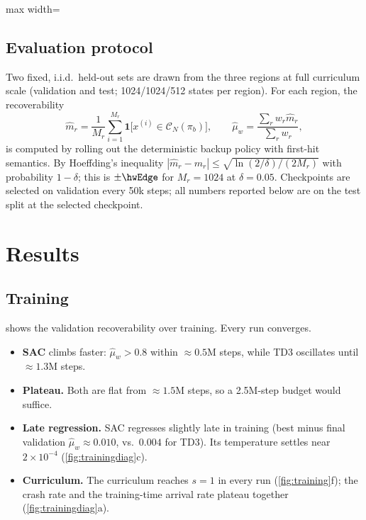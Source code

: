 \documentclass[11pt,a4paper]{article}
\newcommand{\tabfit}[1]{\begin{adjustbox}{max width=\linewidth}\end{adjustbox}}
\begin{document}
\begin{table}[t]
\centering\small
\caption{Training hyperparameters (shared by both learners unless stated).}
\label{tab:hparams}
\tabfit{hparams}
\end{table}

\subsection{Evaluation protocol}
Two fixed, i.i.d.\ held-out sets are drawn from the three regions at full curriculum scale (validation
and test; 1024/1024/512 states per region). For each region, the recoverability
\begin{equation}
\hat m_r=\frac1{M_r}\sum_{i=1}^{M_r}\mathbf{1}\big[x^{(i)}\in\mathcal{C}_N(\pi_b)\big],\qquad
\hat\mu_w=\frac{\sum_r w_r\hat m_r}{\sum_r w_r},
\end{equation}
is computed by rolling out the deterministic backup policy with first-hit semantics. By Hoeffding's
inequality $|\hat m_r-m_r|\le\sqrt{\ln(2/\delta)/(2M_r)}$ with probability $1-\delta$; this is $\pm\hwEdge$
for $M_r=1024$ at $\delta=0.05$. Checkpoints are selected on validation every 50k steps; all numbers
reported below are on the test split at the selected checkpoint.

\section{Results}

\subsection{Training}
 shows the validation recoverability over training. Every run converges.
\begin{itemize}
\item \textbf{SAC} climbs faster: $\hat\mu_w>0.8$ within $\approx0.5$M steps, while TD3 oscillates until
$\approx1.3$M steps.
\item \textbf{Plateau.} Both are flat from $\approx1.5$M steps, so a 2.5M-step budget would suffice.
\item \textbf{Late regression.} SAC regresses slightly late in training (best minus final validation
$\hat\mu_w\approx0.010$, vs.\ $0.004$ for TD3). Its temperature settles near $2\times10^{-4}$
(\cref{fig:trainingdiag}c).
\item \textbf{Curriculum.} The curriculum reaches $s=1$ in every run (\cref{fig:training}f); the crash
rate and the training-time arrival rate plateau together (\cref{fig:trainingdiag}a).
\end{itemize}
\end{document}
